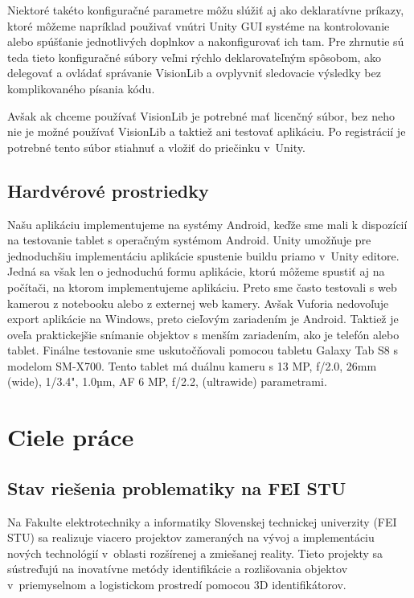 Niektoré takéto konfiguračné parametre môžu slúžiť aj ako deklaratívne príkazy, ktoré môžeme napríklad použivať vnútri Unity GUI systéme na kontrolovanie alebo spúšťanie jednotlivých doplnkov a nakonfigurovať ich tam. Pre zhrnutie sú teda tieto konfiguračné súbory veľmi rýchlo deklarovateľným spôsobom, ako delegovať a ovládať správanie VisionLib a ovplyvniť sledovacie výsledky bez komplikovaného písania kódu. 

Avšak ak chceme používať VisionLib je potrebné mať licenčný súbor, bez neho nie je možné používať VisionLib a taktiež ani testovať aplikáciu. Po registrácií je potrebné tento súbor stiahnuť a vložiť do priečinku v~Unity. \cite{visionlib2023docs}

\subsection{Hardvérové prostriedky}

Našu aplikáciu implementujeme na systémy Android, keďže sme mali k dispozícií na testovanie tablet s operačným systémom Android. Unity umožňuje pre jednoduchšiu implementáciu aplikácie spustenie buildu priamo v~Unity editore. Jedná sa však len o jednoduchú formu aplikácie, ktorú môžeme spustiť aj na počítači, na ktorom implementujeme aplikáciu. Preto sme často testovali s web kamerou z notebooku alebo z externej web kamery. Avšak Vuforia nedovoľuje export aplikácie na Windows, preto cieľovým zariadením je Android. Taktiež je oveľa praktickejšie snímanie objektov s menším zariadením, ako je telefón alebo tablet. Finálne testovanie sme uskutočňovali pomocou tabletu Galaxy Tab S8 s modelom SM-X700. Tento tablet má duálnu kameru s 13 MP, f/2.0, 26mm (wide), 1/3.4", 1.0µm, AF 6 MP, f/2.2, (ultrawide) parametrami.

\section{Ciele práce}

\subsection{Stav riešenia problematiky na FEI STU}

Na Fakulte elektrotechniky a informatiky Slovenskej technickej univerzity (FEI STU) sa realizuje viacero projektov zameraných na vývoj a implementáciu nových technológií v~oblasti rozšírenej a zmiešanej reality. Tieto projekty sa sústreďujú na inovatívne metódy identifikácie a rozlišovania objektov v~priemyselnom a logistickom prostredí pomocou 3D identifikátorov.

